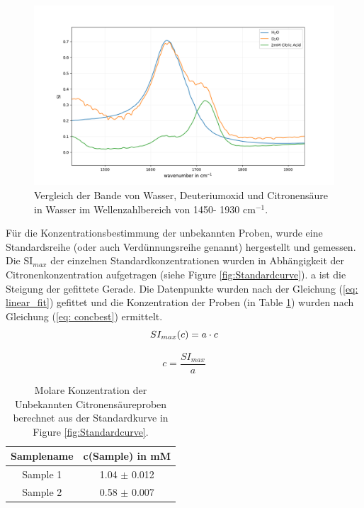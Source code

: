 \documentclass[10pt,a4paper]{article}
\begin{document}
			\begin{figure}[H]
				\centering
				\includegraphics[scale=0.60]{water_citricacid_upclose.png}
				\caption{Vergleich der Bande von Wasser, Deuteriumoxid und Citronensäure in Wasser im Wellenzahlbereich von 1450- 1930 cm$^{-1}$.}
				\label{fig:water_citricacid}
			\end{figure}

			Für die Konzentrationsbestimmung der unbekannten Proben, wurde eine Standardsreihe (oder auch Verdünnungsreihe genannt) hergestellt und gemessen.\\
			Die SI$_{max}$  der einzelnen Standardkonzentrationen wurden in Abhängigkeit der Citronenkonzentration aufgetragen (siehe Figure \ref{fig:Standardcurve}). a ist die Steigung der gefittete Gerade. Die Datenpunkte wurden nach der Gleichung (\ref{eq: linear_fit}) gefittet und die Konzentration der Proben (in Table \ref{tab:sampleconc}) wurden nach Gleichung (\ref{eq: concbest}) ermittelt.\\

			\begin{equation}\label{eq: linear_fit}
				SI_{max} (c)= a \cdot c\\
			\end{equation}
			
			\begin{equation}\label{eq: concbest}
				c = \frac{SI_{max}}{a}
			\end{equation}
			
			\begin{table}[H]
				\centering
				\caption{Molare Konzentration der Unbekannten Citronensäureproben berechnet aus der Standardkurve in Figure \ref{fig:Standardcurve}.}
				\label{tab:sampleconc}
				\begin{tabular}{cc}
					\toprule
					Samplename & c(Sample) in mM\\
					\midrule
					Sample 1 & 1.04 $\pm$ 0.012\\
					Sample 2 & 0.58 $\pm$ 0.007\\
					\bottomrule
				\end{tabular}
			\end{table}	
\end{document}
